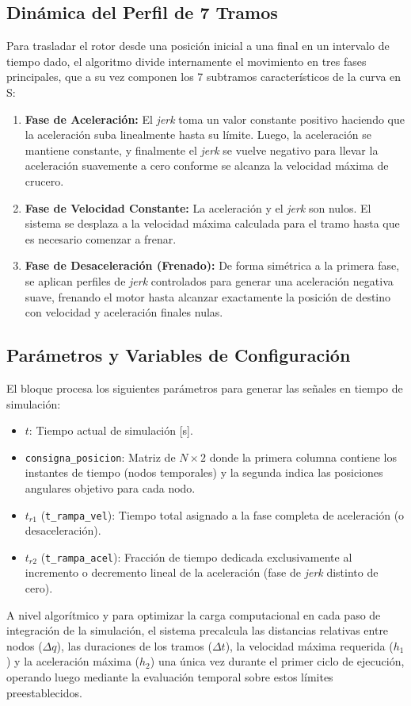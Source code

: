 \documentclass[12pt, a4paper,journal, onecolumn, compsoc]{IEEEtran}
\begin{document}
\subsection{Dinámica del Perfil de 7 Tramos}
Para trasladar el rotor desde una posición inicial a una final en un intervalo de tiempo dado, el algoritmo divide internamente el movimiento en tres fases principales, que a su vez componen los 7 subtramos característicos de la curva en S:
\begin{enumerate}
    \item \textbf{Fase de Aceleración:} El \textit{jerk} toma un valor constante positivo haciendo que la aceleración suba linealmente hasta su límite. Luego, la aceleración se mantiene constante, y finalmente el \textit{jerk} se vuelve negativo para llevar la aceleración suavemente a cero conforme se alcanza la velocidad máxima de crucero.
    \item \textbf{Fase de Velocidad Constante:} La aceleración y el \textit{jerk} son nulos. El sistema se desplaza a la velocidad máxima calculada para el tramo hasta que es necesario comenzar a frenar.
    \item \textbf{Fase de Desaceleración (Frenado):} De forma simétrica a la primera fase, se aplican perfiles de \textit{jerk} controlados para generar una aceleración negativa suave, frenando el motor hasta alcanzar exactamente la posición de destino con velocidad y aceleración finales nulas.
\end{enumerate}

\subsection{Parámetros y Variables de Configuración}
El bloque procesa los siguientes parámetros para generar las señales en tiempo de simulación:
\begin{itemize}
    \item $t$: Tiempo actual de simulación [s].
    \item \texttt{consigna\_posicion}: Matriz de $N \times 2$ donde la primera columna contiene los instantes de tiempo (nodos temporales) y la segunda indica las posiciones angulares objetivo para cada nodo.
    \item $t_{r1}$ (\texttt{t\_rampa\_vel}): Tiempo total asignado a la fase completa de aceleración (o desaceleración).
    \item $t_{r2}$ (\texttt{t\_rampa\_acel}): Fracción de tiempo dedicada exclusivamente al incremento o decremento lineal de la aceleración (fase de \textit{jerk} distinto de cero).
\end{itemize}

A nivel algorítmico y para optimizar la carga computacional en cada paso de integración de la simulación, el sistema precalcula las distancias relativas entre nodos ($\Delta q$), las duraciones de los tramos ($\Delta t$), la velocidad máxima requerida ($h_1$) y la aceleración máxima ($h_2$) una única vez durante el primer ciclo de ejecución, operando luego mediante la evaluación temporal sobre estos límites preestablecidos.
\label{anexo:gen_trayectorias}
\end{document}

